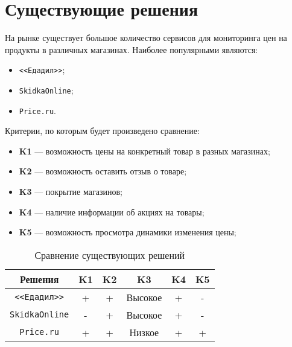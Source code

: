 \section{Существующие решения}

На рынке существует большое количество сервисов для мониторинга цен на продукты в различных магазинах. Наиболее популярными являются:

\begin{itemize}[label=--]
	\item \texttt{<<Едадил>>};
	\item \texttt{SkidkaOnline};
	\item \texttt{Price.ru}.
\end{itemize}

Критерии, по которым будет произведено сравнение:

\begin{itemize}[label=--]
	\item \textbf{K1} --- возможность цены на конкретный товар в разных магазинах;
	\item \textbf{K2} --- возможность оставить отзыв о товаре;
	\item \textbf{K3} --- покрытие магазинов;
	\item \textbf{K4} --- наличие информации об акциях на товары;
	\item \textbf{K5} --- возможность просмотра динамики изменения цены;
\end{itemize}

\clearpage

\begin{table}[ht]
	\small
	\begin{center}
		\begin{threeparttable}
			\caption{Сравнение существующих решений}
			\label{tbl:exist_sol}
			\begin{tabular}{|c|c|c|c|c|c|}
				\hline
				Решения & \textbf{K1} & \textbf{K2} & \textbf{K3} & \textbf{K4} & \textbf{K5} \\
				\hline
				\texttt{<<Едадил>>} & + & + & Высокое & + & - \\
				\hline
				\texttt{SkidkaOnline} & - & + & Высокое & + & - \\
				\hline
				\texttt{Price.ru} & + & + & Низкое & + & + \\
				\hline
			\end{tabular}
		\end{threeparttable}			
	\end{center}
\end{table}

